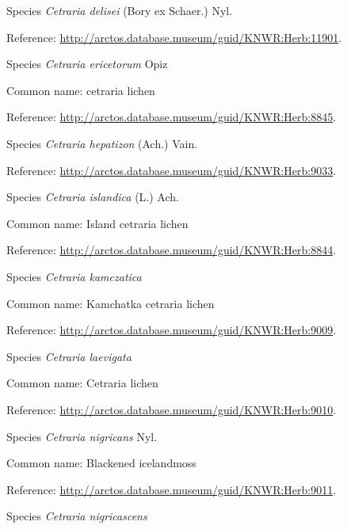 \documentclass[9pt, article]{memoir}
\begin{document}
\begin{multicols}{2}
\vspace{6pt}\noindent\hspace{36pt}Species \textit{Cetraria delisei} (Bory ex Schaer.) Nyl.


Reference: 
\url{http://arctos.database.museum/guid/KNWR:Herb:11901}.

\vspace{6pt}\noindent\hspace{36pt}Species \textit{Cetraria ericetorum} Opiz


Common name: cetraria lichen

Reference: 
\url{http://arctos.database.museum/guid/KNWR:Herb:8845}.

\vspace{6pt}\noindent\hspace{36pt}Species \textit{Cetraria hepatizon} (Ach.) Vain.


Reference: 
\url{http://arctos.database.museum/guid/KNWR:Herb:9033}.

\vspace{6pt}\noindent\hspace{36pt}Species \textit{Cetraria islandica} (L.) Ach.


Common name: Island cetraria lichen

Reference: 
\url{http://arctos.database.museum/guid/KNWR:Herb:8844}.

\vspace{6pt}\noindent\hspace{36pt}Species \textit{Cetraria kamczatica}


Common name: Kamchatka cetraria lichen

Reference: 
\url{http://arctos.database.museum/guid/KNWR:Herb:9009}.

\vspace{6pt}\noindent\hspace{36pt}Species \textit{Cetraria laevigata}


Common name: Cetraria lichen

Reference: 
\url{http://arctos.database.museum/guid/KNWR:Herb:9010}.

\vspace{6pt}\noindent\hspace{36pt}Species \textit{Cetraria nigricans} Nyl.


Common name: Blackened icelandmoss

Reference: 
\url{http://arctos.database.museum/guid/KNWR:Herb:9011}.

\vspace{6pt}\noindent\hspace{36pt}Species \textit{Cetraria nigricascens}



\end{multicols}
\end{document}
